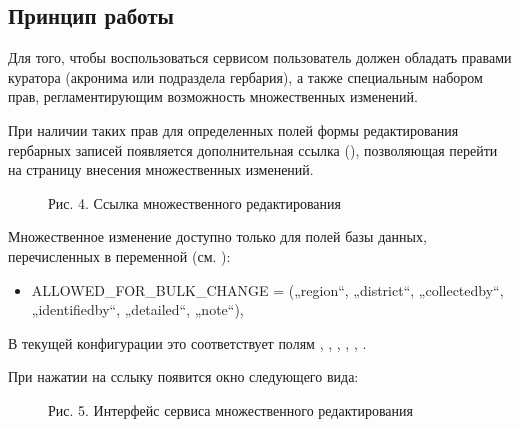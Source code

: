 \documentclass[letterpaper,10pt,russian]{sphinxmanual}
\begin{document}
\subsection{Принцип работы}
\label{\detokenize{main:id59}}
Для того, чтобы воспользоваться сервисом пользователь должен обладать правами
куратора (акронима или подраздела гербария), а также специальным набором прав,
регламентирующим возможность множественных изменений.

При наличии таких прав для определенных полей формы редактирования гербарных записей
появляется дополнительная ссылка ({\hyperref[\detokenize{main:main-pic4}]{}}), позволяющая перейти
на страницу внесения множественных изменений.

\begin{figure}[htbp]
\centering
\capstart

\noindent{}
\caption{Рис. 4. Ссылка множественного редактирования}\label{\detokenize{main:main-pic4}}\label{\detokenize{main:id67}}\end{figure}

Множественное изменение доступно только для полей базы данных, перечисленных
в переменной (см. ):
\begin{itemize}
\item {} 
ALLOWED\_FOR\_BULK\_CHANGE = („region“, „district“, „collectedby“, „identifiedby“, „detailed“, „note“),

\end{itemize}

В текущей конфигурации это соответствует полям
{\hyperref[\detokenize{main:id24}]{}}, {\hyperref[\detokenize{main:id25}]{}}, {\hyperref[\detokenize{main:id29}]{}}, {\hyperref[\detokenize{main:id31}]{}}, {\hyperref[\detokenize{main:id26}]{}}, {\hyperref[\detokenize{main:id35}]{}}.

При нажатии на сслыку  {\hyperref[\detokenize{main:main-pic5}]{}} появится окно следующего вида:

\begin{figure}[htbp]
\centering
\capstart

\noindent{}
\caption{Рис. 5. Интерфейс сервиса множественного редактирования}\label{\detokenize{main:main-pic5}}\label{\detokenize{main:id68}}\end{figure}
\end{document}
